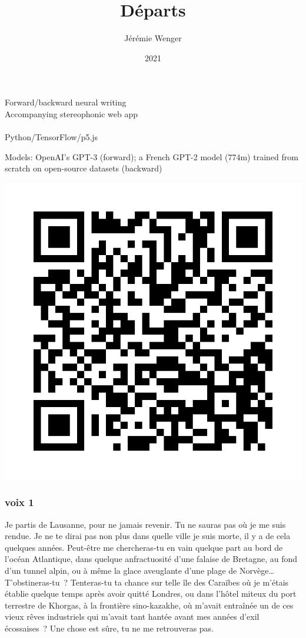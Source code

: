 \documentclass[
  extrafontsizes,
  oneside,
  14pt
]{memoir}
\title{\Huge{Départs}}
\author{Jérémie Wenger}
\date{2021}
\begin{document}
\maketitle

\vfill

\noindent Forward/backward neural writing\\
Accompanying stereophonic web app
\\
\\
Python/TensorFlow/p5.js

\noindent Models: OpenAI's GPT-3 (forward); a French GPT-2 model (774m)
trained from scratch on open-source datasets (backward)

\includegraphics{qr}

\newpage

\subsubsection{voix 1}\label{voix-1}

Je partis de Lausanne, pour ne jamais revenir. Tu ne sauras pas où je me suis
rendue. Je ne te dirai pas non plus dans quelle ville je suis morte, il y a de
cela quelques années. Peut-être me chercheras-tu en vain quelque part au bord
de l'océan Atlantique, dans quelque anfractuosité d'une falaise de Bretagne, au
fond d'un tunnel alpin, ou à même la glace aveuglante d'une plage de
Norvège\ldots{} T'obstineras-tu~? Tenteras-tu ta chance sur telle île des
Caraïbes où je m'étais établie quelque temps après avoir quitté Londres, ou
dans l'hôtel miteux du port terrestre de Khorgas, à la frontière sino-kazakhe,
où m'avait entraînée un de ces vieux rêves industriels qui m'avait tant hantée
avant mes années d'exil écossaises~? Une chose est sûre, tu ne me retrouveras
pas.
\end{document}
